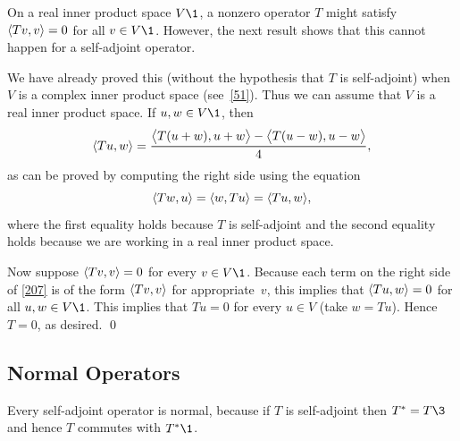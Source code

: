 On a real inner product space $V\1$, a nonzero operator $T$ might satisfy
$\langle Tv, v\rangle = 0$ for all $v \in V\1$.  However, the next result shows that this
cannot happen for a self-adjoint operator.


\proof
We have already proved this (without the hypothesis that $T$ is self-adjoint) when
$V$ is a complex inner product space (see~\ref{51}).  Thus we can assume that
$V$ is a real inner product space.
If $u, w \in V\1$, then
\begin{equation} \label{207}
\ip{Tu, w} = \frac{ \ip[\big]{T(u+w), u+w} -\ip[\big]{T(u-w), u-w}}{4},
\end{equation}%
as can be proved by computing the right side using the equation
\[
\langle Tw, u\rangle = \langle w, Tu\rangle
= \langle Tu, w\rangle,
\]
where the first equality holds because $T$ is self-adjoint and the second
equality holds because we are working in a real inner product space.

Now suppose $\langle Tv, v\rangle = 0$ for every $v \in V\1$. Because each term on the right side of \ref{207} is of the form $\langle Tv, v\rangle$ for appropriate~$v$, this implies that $\langle Tu, w\rangle = 0$ for all $u, w \in V\1$.  This implies that $Tu = 0$ for every $u \in V$ (take $w = Tu$). Hence $T = 0$, as desired.
\qed

\subsection{Normal Operators}


Every self-adjoint operator is normal, because if $T$ is self-adjoint then $T^* = T\3$ and hence $T$ commutes with $T^*\1$.

